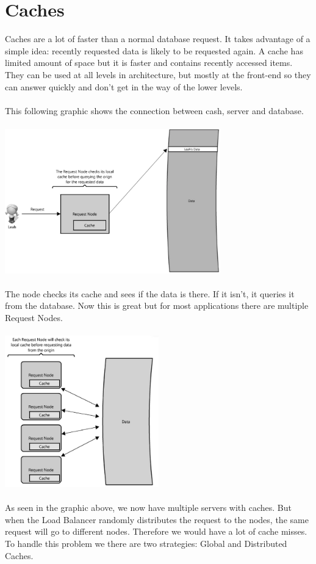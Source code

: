 \documentclass[12p]{article}
\begin{document}
	\newpage
	\section{Caches}
	
	Caches are a lot of faster than a normal database request. It takes advantage of a simple idea: recently requested data is likely to be requested again. A cache has limited amount of space but it is faster and contains recently accessed items. They can be used at all levels in architecture, but mostly at the front-end so they can answer quickly and don't get in the way of the lower levels. \\\\
	This following graphic shows the connection between cash, server and database. \\\\
	\includegraphics[width=0.7\textwidth]{img/cache1} \cite{cache} \\\\
	The node checks its cache and sees if the data is there. If it isn't, it queries it from the database. Now this is great but for most applications there are multiple Request Nodes. \\\\
	\includegraphics[width=0.5\textwidth]{img/cache2} \cite{cache} \\\\
	As seen in the graphic above, we now have multiple servers with caches. But when the Load Balancer randomly distributes the request to the nodes, the same request will go to different nodes. Therefore we would have a lot of cache misses. To handle this problem we there are two strategies: Global and Distributed Caches. 
	
\end{document}
